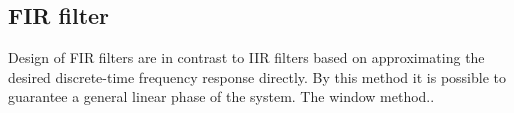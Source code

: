 %
%
 

\subsection{FIR filter}
Design of FIR filters are in contrast to IIR filters based on approximating the desired discrete-time frequency response directly. By this method it is possible to guarantee a general linear phase of the system. The window method..   

